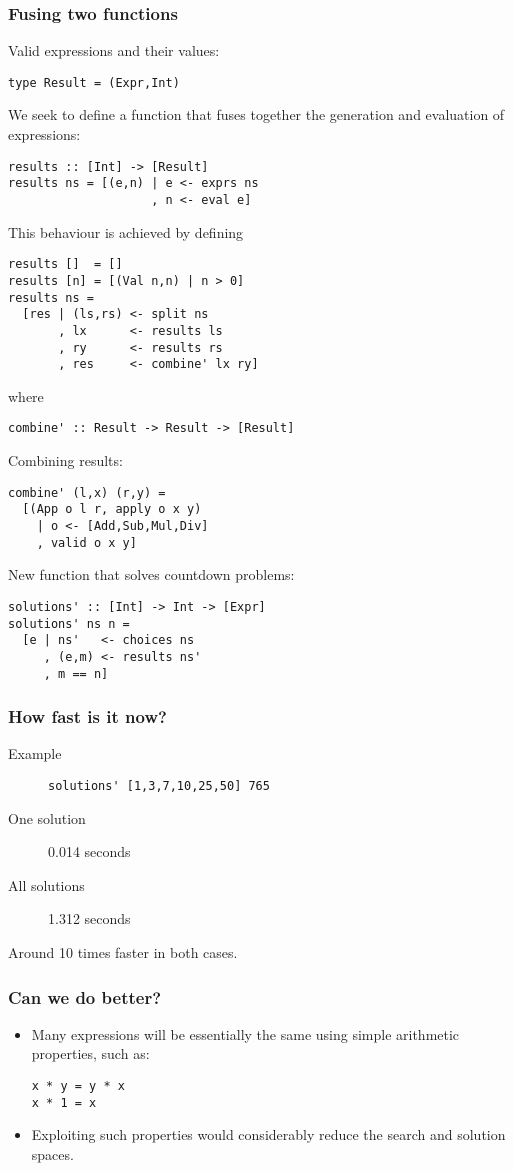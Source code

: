\begin{multicols}{2}
\subsubsection{Fusing two functions}
Valid expressions and their values:
\begin{lstlisting}
type Result = (Expr,Int)
\end{lstlisting}

We seek to define a function that fuses together the generation and evaluation of expressions:
\begin{lstlisting}
results :: [Int] -> [Result]
results ns = [(e,n) | e <- exprs ns
                    , n <- eval e]
\end{lstlisting}

This behaviour is achieved by defining
\begin{lstlisting}
results []  = []
results [n] = [(Val n,n) | n > 0]
results ns =
  [res | (ls,rs) <- split ns
       , lx      <- results ls
       , ry      <- results rs
       , res     <- combine' lx ry]
\end{lstlisting}
where
\begin{lstlisting}
combine' :: Result -> Result -> [Result]
\end{lstlisting}

Combining results:
\begin{lstlisting}
combine' (l,x) (r,y) =
  [(App o l r, apply o x y)
    | o <- [Add,Sub,Mul,Div]
    , valid o x y]
\end{lstlisting}
New function that solves countdown problems:
\begin{lstlisting}
solutions' :: [Int] -> Int -> [Expr]
solutions' ns n =
  [e | ns'   <- choices ns
     , (e,m) <- results ns'
     , m == n]
\end{lstlisting}

\subsubsection{How fast is it now?}
\begin{description}
  \item[Example] \lstinline{solutions' [1,3,7,10,25,50] 765}
  \item[One solution] 0.014 seconds
  \item[All solutions] 1.312 seconds   
\end{description}
Around 10 times faster in both cases.

\subsubsection{Can we do better?}
\begin{itemize}
  \item Many expressions will be essentially the same using simple arithmetic properties, such as:
\begin{lstlisting}
x * y = y * x
x * 1 = x
\end{lstlisting}
  \item Exploiting such properties would considerably reduce the search and solution spaces.
\end{itemize}


\end{multicols}
